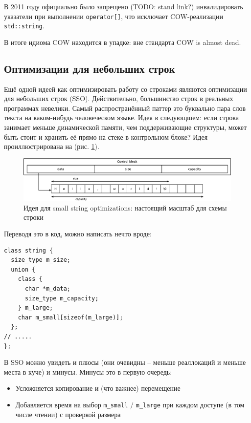 \documentclass[a4paper,12pt,oneside]{book}
\begin{document}
В 2011 году официально было запрещено (TODO: stand link?) инвалидировать указатели при выполнении \lstinline!operator[]!, что исключает COW-реализации \lstinline!std::string!.

В итоге идиома COW находится в упадке: вне стандарта COW is almost dead.

\subsection{Оптимизации для небольших строк}\label{subsub:sso}

Ещё одной идеей как оптимизировать работу со строками являются оптимизации для небольших строк (SSO). Действительно, большинство строк в реальных программах невелики. Самый распространённый паттер это буквально пара слов текста на каком-нибудь человеческом языке. Идея в следующшем: если строка занимает меньше динамической памяти, чем поддерживающие структуры, может быть стоит и хранить её прямо на стеке в контрольном блоке? Идея проиллюстрирована на (рис. \ref{fig:string-sso-controlblock}).

\begin{figure}[ht]
\centering
\includegraphics[width=1.0\textwidth]{illustrations/string-sso-controlblock-crop.pdf}
\caption{Идея для small string optimizations: настоящий масштаб для схемы строки}
\label{fig:string-sso-controlblock}
\end{figure}

Переводя это в код, можно написать нечто вроде:

\begin{lstlisting}
class string {
  size_type m_size;
  union {
    class {
      char *m_data;
      size_type m_capacity;
    } m_large;
    char m_small[sizeof(m_large)];
  };
// .....
};
\end{lstlisting}

В SSO можно увидеть и плюсы (они очевидны -- меньше реаллокаций и меньше места в куче) и минусы. Минусы это в первую очередь:

\begin{itemize}
\item Усложняется копирование и (что важнее) перемещение
\item  Добавляется время на выбор \lstinline!m_small! / \lstinline!m_large! при каждом доступе (в том числе чтении) с проверкой размера
\end{itemize}
\end{document}
